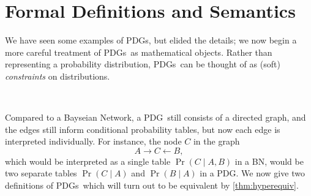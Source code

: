 \documentclass{article}
\newcommand\changeon{\color{note-fg} }
\newcommand{\MN}{PDG}
\newcommand{\MNs}{\MN s}
\begin{document}
	



	
	
	\section{Formal Definitions and Semantics}\label{sec:formal+semantics}
	
	\changeon
	We have seen some examples of \MNs, but elided the details; we now begin a more careful treatment of \MNs\ as mathematical objects. Rather than representing a probability distribution, \MNs\ can be thought of as (soft) \emph{constraints} on distributions.

	
	
	
	
	\todo\
	
	
	Compared to a Bayseian Network, a \MN\ still consists of a directed graph, and the edges still inform conditional probability tables, but now each edge is interpreted individually. For instance, the node $C$ in the graph
	\[ A \!\rightarrow\! C \!\leftarrow\! B,\]
	which would be interpreted as a single table $\Pr(C\mid A, B)$ in a BN, would be two separate tables $\Pr(C \mid A)$ and $\Pr(B \mid A)$ in a \MN. We now give two definitions of \MNs\, which will turn out to be equivalent by \cref{thm:hyperequiv}.
\end{document}
